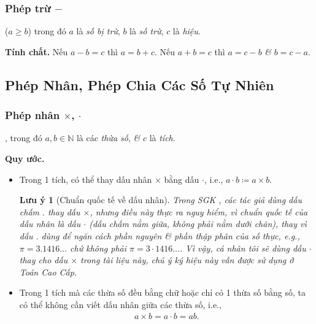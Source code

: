 \documentclass{article}
\numberwithin{equation}{section}
\newtheorem{luuy}{Lưu ý}[section]
\begin{document}
\subsubsection{Phép trừ $-$}
 ($a\ge b$) trong đó $a$ là \textit{số bị trừ}, $b$ là \textit{số trừ}, $c$ là \textit{hiệu}.

\noindent\textbf{Tính chất.} Nếu $a - b = c$ thì $a = b + c$. Nếu $a + b = c$ thì $a = c - b$ \textit{\&} $b = c - a$.


\subsection{Phép Nhân, Phép Chia Các Số Tự Nhiên}

\subsubsection{Phép nhân $\times$, $\cdot$}
, trong đó $a,b\in\mathbb{N}$ là các \textit{thừa số}, \textit{\&} $c$ là \textit{tích}.

\noindent\textbf{Quy ước.}
\begin{itemize}
	\item Trong 1 tích, có thể thay dấu nhân $\times$ bằng dấu $\cdot$, i.e., $a\cdot b\coloneqq a\times b$.
	
	\begin{luuy}[Chuẩn quốc tế về dấu nhân]
		Trong SGK \cite[p. 18]{SGK_Toan_6_Canh_Dieu_tap_1}, các tác giả dùng dấu chấm $.$ thay dấu $\times$, nhưng điều này thực ra nguy hiểm, vì chuẩn quốc tế của dấu nhân là dấu $\cdot$ (dấu chấm nằm giữa, không phải nằm dưới chân), thay vì dấu $.$ dùng để ngăn cách phần nguyên \textit{\&} phần thập phân của số thực, e.g., $\pi = 3.1416\ldots$ chứ không phải $\pi = 3\cdot 1416\ldots$. Vì vậy, cá nhân tôi sẽ dùng dấu $\cdot$ thay cho dấu $\times$ trong tài liệu này, chú ý ký hiệu này vẫn được sử dụng ở Toán Cao Cấp.
	\end{luuy}
	\item Trong 1 tích mà các thừa số đều bằng chữ hoặc chỉ có 1 thừa số bằng số, ta có thể không cần viết dấu nhân giữa các thừa số, i.e.,
	\begin{align*}
		a\times b = a\cdot b = ab.
	\end{align*}
\end{itemize}
\end{document}
